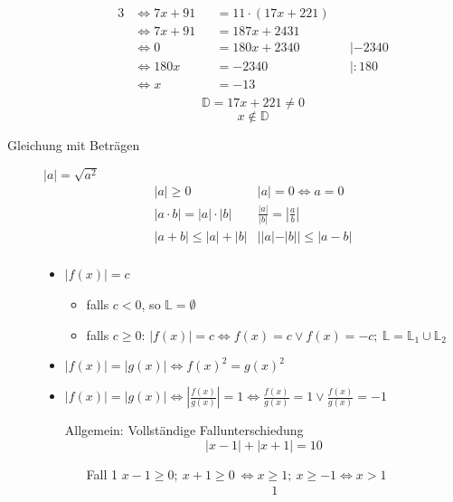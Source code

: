 \begin{description}
\begin{alignat*}{3}
        & \Leftrightarrow 7x + 91     &  & = 11 \cdot (17x+221)                          \\
        & \Leftrightarrow 7x + 91     &  & = 187x + 2431                                 \\
        & \Leftrightarrow 0           &  & = 180x +2340         &  & |-2340              \\
        & \Leftrightarrow 180x        &  & = -2340              &  & | :180              \\
        & \Leftrightarrow x           &  & = -13                                         \\
    \end{alignat*}
    $$\mathbb{D} = 17x+221 \not = 0$$
    $$x \not \in \mathbb{D}$$
    \item[Gleichung mit Beträgen] $|a| = \sqrt{a^2}$
    $$\begin{array}{ll}
          |a| \geq 0                  & |a| = 0 \Leftrightarrow a = 0              \\
          |a \cdot b| = |a| \cdot |b| & \frac{|a|}{|b|} = \left|\frac{a}{b}\right| \\
          |a+b| \leq  |a| + |b|       & ||a|-|b|| \leq |a-b|                       \\
    \end{array}$$
    \begin{itemize}
        \item $|f(x)| = c$ \
        \begin{itemize}
            \item falls $c<0$, so $\mathbb{L}= \emptyset$
            \item falls $c\geq0$: $|f(x)| = c \Leftrightarrow f(x) = c \vee f(x) = -c;\ \mathbb{L} = \mathbb{L}_1 \cup \mathbb{L}_2$
        \end{itemize}
        \item $|f(x)| = |g(x)| \Leftrightarrow f(x)^2 = g(x)^2$
        \item $|f(x)| = |g(x)| \Leftrightarrow \left|\frac{f(x)}{g(x)}\right| = 1 \Leftrightarrow \frac{f(x)}{g(x)} = 1 \vee \frac{f(x)}{g(x)} = -1$
        \item[Allgemein:] Vollständige Fallunterschiedung
        $$|x-1|+|x+1|=10$$
        \begin{itemize}
            \item[Fall 1] $x-1 \geq 0;\ x+1 \geq 0 \ \Leftrightarrow x \geq 1;\ x\geq -1 \Leftrightarrow x>1$
            \begin{alignat*} {1}

\end{alignat*}
\end{itemize}
\end{itemize}
\end{description}
